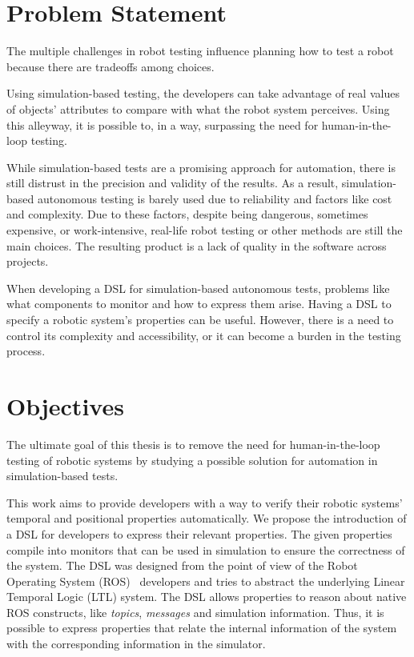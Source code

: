 \section{Problem Statement}
\label{sec:problem}

The multiple challenges in robot testing influence planning how to test a robot because there are tradeoffs among choices.

Using simulation-based testing, the developers can take advantage of real values of objects' attributes to compare with what the robot system perceives. Using this alleyway, it is possible to, in a way, surpassing the need for human-in-the-loop testing. 
 
While simulation-based tests are a promising approach for automation, there is still distrust in the precision and validity of the results. As a result, simulation-based autonomous testing is barely used due to reliability and factors like cost and complexity. Due to these factors, despite being dangerous, sometimes expensive, or work-intensive, real-life robot testing or other methods are still the main choices. The resulting product is a lack of quality in the software across projects.

When developing a DSL for simulation-based autonomous tests, problems like what components to monitor and how to express them arise. Having a DSL to specify a robotic system's properties can be useful. However, there is a need to control its complexity and accessibility, or it can become a burden in the testing process.


\section{Objectives}
\label{sec:objectives}

The ultimate goal of this thesis is to remove the need for human-in-the-loop testing of robotic systems by studying a possible solution for automation in simulation-based tests.

This work aims to provide developers with a way to verify their robotic systems' temporal and positional properties automatically. We propose the introduction of a DSL for developers to express their relevant properties. The given properties compile into monitors that can be used in simulation to ensure the correctness of the system. The DSL was designed from the point of view of the Robot Operating System (ROS)~\cite{quigley2009ros} developers and tries to abstract the underlying Linear Temporal Logic (LTL) system. The DSL allows properties to reason about native ROS constructs, like \textit{topics}, \textit{messages} and simulation information. Thus, it is possible to express properties that relate the internal information of the system with the corresponding information in the simulator.

